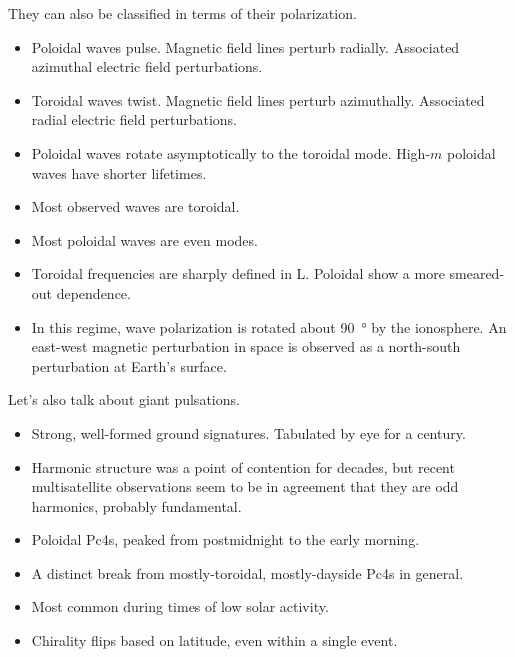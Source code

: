 \documentclass{article}
\newcommand{\azm}{\ensuremath{m}\xspace}
\begin{document}
They can also be classified in terms of their polarization.

\begin{itemize}
    \item Poloidal waves pulse. Magnetic field lines perturb radially. Associated azimuthal electric field perturbations.
    \item Toroidal waves twist. Magnetic field lines perturb azimuthally. Associated radial electric field perturbations.
    \item Poloidal waves rotate asymptotically to the toroidal mode. High-\azm poloidal waves have shorter lifetimes\cite{mann_1995,mann_1997,radoski_1974}.
    \item Most observed waves are toroidal\cite{anderson_1990}.
    \item Most poloidal waves are even modes\cite{hughes_1978,singer_1982,takahashi_1990}.
    \item Toroidal frequencies are sharply defined in L. Poloidal show a more smeared-out dependence. \cite{engebretson_1986}
    \item In this regime, wave polarization is rotated about \SI{90}{\degree} by the ionosphere\cite{nishida_1964_screening}. An east-west magnetic perturbation in space is observed as a north-south perturbation at Earth's surface.
\end{itemize}

Let's also talk about giant pulsations.

\begin{itemize}
    \item Strong, well-formed ground signatures. Tabulated by eye for a century\cite{birkeland_1901}.
    \item Harmonic structure was a point of contention for decades, but recent multisatellite observations seem to be in agreement that they are odd harmonics, probably fundamental\cite{glassmeier_1999,hillebrand_1982,kokubun_1989,takahashi_2011}.
    \item Poloidal Pc4s, peaked from postmidnight to the early morning\cite{chisham_1991,glassmeier_1980,rostoker_1979}.
    \item A distinct break from mostly-toroidal, mostly-dayside Pc4s in general.
    \item Most common during times of low solar activity\cite{brekke_1987}.
    \item Chirality flips based on latitude, even within a single event\cite{harang_1941}.
\end{itemize}
\end{document}
